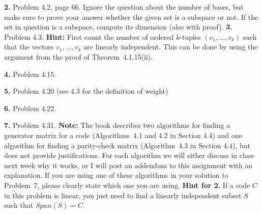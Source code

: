 \documentclass[12pt]{amsart}
\begin{document}
{\bf 2.} Problem 4.2, page 66. Ignore the question about the number of bases, but make sure to prove your answer whether the given set is a subspace or not. If the set in question is a subspace, compute its dimension (also with proof).
\skv
{\bf 3.} Problem 4.3. {\bf Hint:} First count the number of ordered $k$-tuples $(v_1,\ldots, v_k)$ such that the vectors $v_1,\ldots, v_k$ are linearly independent. This can be done by using the argument from the proof of Theorem~4.1.15(ii).
\skv

{\bf 4.} Problem 4.15.

{\bf 5.} Problem 4.20 (see 4.3 for the definition of weight)

{\bf 6.} Problem 4.22.

{\bf 7.} Problem 4.31. {\bf Note:} The book describes two algorithms for finding a generator matrix for a code (Algorithms~4.1 and 4.2 in Section 4.4) and one algorithm for finding a parity-check matrix (Algorithm~4.3 in Section 4.4),
but does not provide justifications. For each algorithm we will either discuss in class next week why it works, or I will post an addendum to this assignment with an explanation. If you are using one of these algorithms in your solution to Problem~7, please clearly state which one you are using.
\newpage
{\bf Hint for 2.} If a code $C$ in this problem is linear, you just need to find a linearly independent subset $S$
such that $Span(S)=C$.
\end{document}
